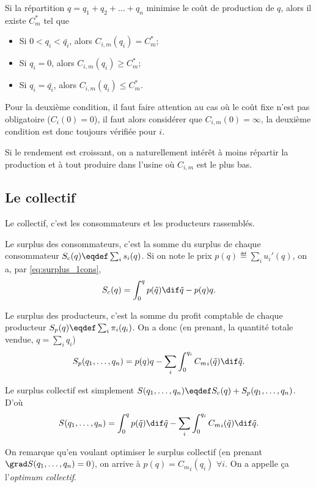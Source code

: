 Si la répartition $q = q_1 + q_2 + \ldots + q_n$ minimise le coût de
production de $q$, alors il existe $C_m^*$ tel que
\begin{itemize}
  \item Si $0 < q_i < \bar{q_i}$, alors $C_{i,m}(q_i) = C_m^*$;
  \item Si $q_i = 0$, alors $C_{i,m}(q_i) \geq C_m^*$;
  \item Si $q_i = \bar{q_i}$, alors $C_{i,m}(q_i) \leq C_m^*$.
\end{itemize}

Pour la deuxième condition,
il faut faire attention au cas où le coût fixe
n'est pas obligatoire ($C_i(0) = 0$),
il faut alors considérer que $C_{i,m}(0)=\infty$,
la deuxième condition est donc toujours vérifiée pour $i$.

Si le rendement est croissant,
on a naturellement intérêt à moins répartir la production et à
tout produire dans l'usine où $C_{i,m}$ est le plus bas.

\subsection{Le collectif}
Le collectif, c'est les consommateurs et les producteurs rassemblés.

Le surplus des consommateurs, c'est la somme du surplus de chaque consommateur
$\surpluscons(q) \eqdef \sum_i s_i(q)$.
Si on note le prix $p(q) \eqdef \sum_i u_i'(q)$, on a, par \eqref{eq:surplus_1cons},
\[ \surpluscons(q) = \int_0^{q}p(\tilde{q}) \dif \tilde{q} - p(q) q. \]

Le surplus des producteurs, c'est la somme du profit comptable de chaque
producteur
$\surplusprod(q) \eqdef \sum_i \pcompt_i(q_i)$.
On a donc (en prenant, la quantité totale vendue, $q = \sum_i q_i$)
\[ \surplusprod(q_1, \ldots, q_n) = p(q)q -
\sum_i \int_0^{q_i} {C_m}_i(\tilde{q}) \dif \tilde{q}. \]

Le surplus collectif est simplement
$\surpluscoll(q_1, \ldots, q_n)
\eqdef \surpluscons(q) + \surplusprod(q_1, \ldots, q_n)$.
D'où
\[ \surpluscoll(q_1, \ldots, q_n) =
  \int_0^{q}p(\tilde{q}) \dif \tilde{q}
- \sum_i \int_0^{q_i} {C_m}_i(\tilde{q}) \dif \tilde{q}. \]

On remarque qu'en voulant optimiser le surplus collectif
(en prenant $\grad \surpluscoll(q_1, \ldots, q_n) = 0$),
on arrive à $p(q) = {C_m}_i(q_i)$ $\forall i$.
On a appelle ça l'\emph{optimum collectif}.

